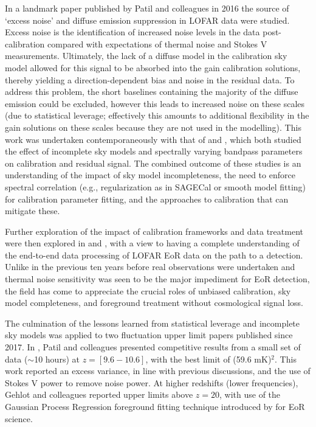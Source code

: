 In a landmark paper published by Patil and colleagues in 2016 \cite{patil16} the source of `excess noise' and diffuse emission suppression in LOFAR data were studied. Excess noise is the identification of increased noise levels in the data post-calibration compared with expectations of thermal noise and Stokes V measurements. Ultimately, the lack of a diffuse model in the calibration sky model allowed for this signal to be absorbed into the gain calibration solutions, thereby yielding a direction-dependent bias and noise in the residual data. To address this problem, the short baselines containing the majority of the diffuse emission could be excluded, however this leads to increased noise on these scales (due to statistical leverage; effectively this amounts to additional flexibility in the gain solutions on these scales because they are not used in the modelling). This work was undertaken contemporaneously with that of \cite{barry16} and \cite{trottwayth2016}, which both studied the effect of incomplete sky models and spectrally varying bandpass parameters on calibration and residual signal. The combined outcome of these studies is an understanding of the impact of sky model incompleteness, the need to enforce spectral correlation (e.g., regularization as in SAGECal or smooth model fitting) for calibration parameter fitting, and the approaches to calibration that can mitigate these.

Further exploration of the impact of calibration frameworks and data treatment were then explored in \cite{2019MNRAS.483.5480M} and \cite{2019MNRAS.484.2866O}, with a view to having a complete understanding of the end-to-end data processing of LOFAR EoR data on the path to a detection. Unlike in the previous ten years before real observations were undertaken and thermal noise sensitivity was seen to be the major impediment for EoR detection, the field has come to appreciate the crucial roles of unbiased calibration, sky model completeness, and foreground treatment without cosmological signal loss.

The culmination of the lessons learned from statistical leverage and incomplete sky models was applied to two fluctuation upper limit papers published since 2017. In \cite{2017ApJ...838...65P}, Patil and colleagues presented competitive results from a small set of data ($\sim$10 hours) at $z = [9.6 - 10.6]$, with the best limit of (59.6 mK)$^2$. This work reported an excess variance, in line with previous discussions, and the use of Stokes V power to remove noise power. At higher redshifts (lower frequencies), Gehlot and colleagues \cite{2018arXiv180906661G} reported upper limits above $z=20$, with use of the Gaussian Process Regression foreground fitting technique introduced by \cite{2018MNRAS.478.3640M} for EoR science.

